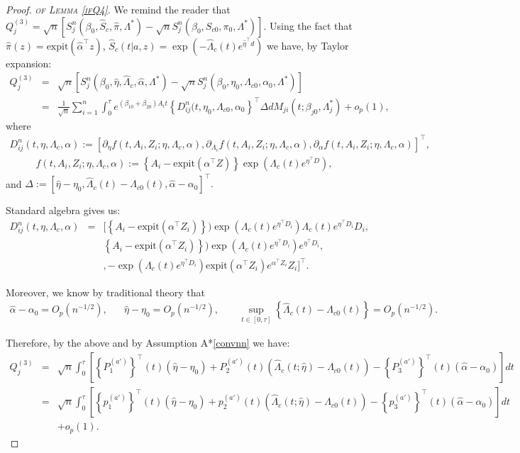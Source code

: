 \documentclass[11pt]{article}
\newcommand{\ee}{\end{eqnarray}}
\newcommand{\eqnn}{\begin{eqnarray*}}
\newcommand{\een}{\end{eqnarray*}}
\newcommand{\be}{\begin{eqnarray}}
\newcommand{\expit}{\text{expit}}
\begin{document}
\newenvironment{newproof8}{\begin{proof}\textsc{\emph{of Lemma \ref{ifQ4}.}}}{\end{proof}}

\begin{newproof8}
We remind the reader that \\$Q^{(3)}_j=\sqrt{n}\left[{S}_j^n(\beta_0, \hat S_c,  \hat \pi,   \Lambda^{*})-\sqrt{n}{S}_j^n(\beta_0, S_{c0}, \pi_0,\Lambda^{*})\right]$.
Using the fact that $\hat\pi(z)=\expit(\hat\alpha^\top z)$, $\hat S_c(t | a,z)=\exp\left(-\hat\Lambda_{c}(t)e^{\hat\eta^\top d}\right)$ we have, by Taylor expansion:
\eqnn
Q^{(3)}_j&=&\sqrt{n}\left[{S}_j^n(\beta_0, \hat\eta, \hat \Lambda_{c} , \hat \alpha,  \Lambda^{*})-\sqrt{n}{S}_j^n(\beta_0, \eta_0, \Lambda_{c0}, \alpha_0, \Lambda^{*})\right]\\
&=&\frac{1}{\sqrt{n}}\sum_{i=1}^n\int_0^\tau e^{(\beta_{10}+\beta_{20})A_it}\left\{{D}_{ij}^n(t,\eta_{0}, \Lambda_{c0}, \alpha_0\right\}^\top{\Delta} dM_{ji}(t; \beta_{j0}, \Lambda^{*}_j)+o_p(1),
\een
where
\eqnn
{D}_{ij}^n(t, \eta,\Lambda_{c},\alpha):=[\partial_{\eta} f (t,A_i,Z_i;\eta,\Lambda_{c},\alpha),
\partial_{\Lambda_{c}} f(t,A_i,Z_i;\eta,\Lambda_{c},\alpha),
\partial_\alpha f(t,A_i,Z_i;\eta,\Lambda_{c},\alpha)
]^\top,
\een
\eqnn
f (t,A_i,Z_i; \eta,\Lambda_{c},\alpha):=\left\{A_i-\expit(\alpha^\top Z)\right\}\exp\left(\Lambda_{c}(t)e^{\eta^\top D}\right),\een
and 
$
{\Delta}:=[\hat\eta-\eta_0,
\hat\Lambda_{c}(t)-\Lambda_{c0}(t),
\hat\alpha-\alpha_0]^\top.
$

Standard algebra gives us:
\eqnn
{D}_{ij}^n(t, \eta,\Lambda_{c},\alpha)&=&[ \left\{A_i-\expit(\alpha^\top Z_i)\right\})\exp\left(\Lambda_{c}(t)e^{\eta^\top D_i}\right)\Lambda_{c}(t)e^{\eta^\top D_i}D_i,\\&&
\left\{A_i-\expit(\alpha^\top Z_i)\right\})\exp\left(\Lambda_{c}(t)e^{\eta^\top D_i}\right)e^{\eta^\top D_i},\\
&&,-\exp\left(\Lambda_{c}(t)e^{\eta^\top D_i}\right)\expit(\alpha^\top Z_i)e^{\alpha^\top Z_i}Z_i
]^\top.
\een

Moreover, we know by traditional theory that
\eqnn
\hat \alpha-\alpha_0=O_p(n^{-1/2}),\;\;\;\;\;\;\hat \eta-\eta_0=O_p(n^{-1/2}),\;\;\;\;\;\;\;\sup_{t \in [0,\tau]} \left\{\hat\Lambda_{c}(t)-\Lambda_{c0}(t)\right\}=O_p(n^{-1/2}).
\een

Therefore, by the above and by Assumption A*\ref{convnn} we have:
\be\label{Q4n}
Q^{(3)}_j&=&\sqrt{n}\int_0^\tau\left[ \left\{P^{(a')}_{1}\right\}^\top(t) (\hat\eta-\eta_0)+P^{(a')}_{2}(t) (\hat\Lambda_{c}(t;  \hat \eta)-\Lambda_{c0}(t))-\left\{P^{(a')}_{3}\right\}^\top(t) (\hat\alpha-\alpha_0)\right]dt\nonumber \\
&=&\sqrt{n}\int_0^\tau \left[ \left\{p^{(a')}_{1}\right\}^\top(t) (\hat\eta-\eta_0)+p^{(a')}_{2}(t) (\hat\Lambda_{c}(t;  \hat \eta)-\Lambda_{c0}(t))-\left\{p^{(a')}_{3}\right\}^\top(t) (\hat\alpha-\alpha_0)\right]dt\nonumber \\&&+o_p(1).
\ee


\end{newproof8}
\end{document}
